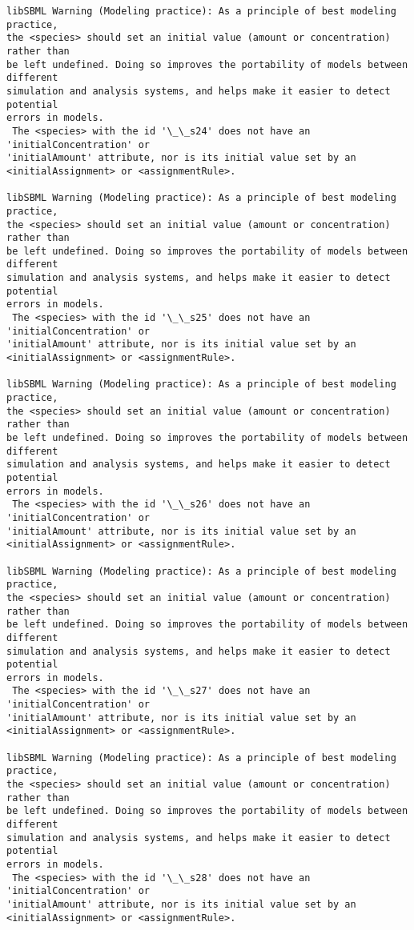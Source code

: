 \documentclass[11pt]{article}
\begin{document}
\begin{Verbatim}[commandchars=\\\{\}]
libSBML Warning (Modeling practice): As a principle of best modeling practice,
the <species> should set an initial value (amount or concentration) rather than
be left undefined. Doing so improves the portability of models between different
simulation and analysis systems, and helps make it easier to detect potential
errors in models.
 The <species> with the id '\_\_s24' does not have an 'initialConcentration' or
'initialAmount' attribute, nor is its initial value set by an
<initialAssignment> or <assignmentRule>.

libSBML Warning (Modeling practice): As a principle of best modeling practice,
the <species> should set an initial value (amount or concentration) rather than
be left undefined. Doing so improves the portability of models between different
simulation and analysis systems, and helps make it easier to detect potential
errors in models.
 The <species> with the id '\_\_s25' does not have an 'initialConcentration' or
'initialAmount' attribute, nor is its initial value set by an
<initialAssignment> or <assignmentRule>.

libSBML Warning (Modeling practice): As a principle of best modeling practice,
the <species> should set an initial value (amount or concentration) rather than
be left undefined. Doing so improves the portability of models between different
simulation and analysis systems, and helps make it easier to detect potential
errors in models.
 The <species> with the id '\_\_s26' does not have an 'initialConcentration' or
'initialAmount' attribute, nor is its initial value set by an
<initialAssignment> or <assignmentRule>.

libSBML Warning (Modeling practice): As a principle of best modeling practice,
the <species> should set an initial value (amount or concentration) rather than
be left undefined. Doing so improves the portability of models between different
simulation and analysis systems, and helps make it easier to detect potential
errors in models.
 The <species> with the id '\_\_s27' does not have an 'initialConcentration' or
'initialAmount' attribute, nor is its initial value set by an
<initialAssignment> or <assignmentRule>.

libSBML Warning (Modeling practice): As a principle of best modeling practice,
the <species> should set an initial value (amount or concentration) rather than
be left undefined. Doing so improves the portability of models between different
simulation and analysis systems, and helps make it easier to detect potential
errors in models.
 The <species> with the id '\_\_s28' does not have an 'initialConcentration' or
'initialAmount' attribute, nor is its initial value set by an
<initialAssignment> or <assignmentRule>.


\end{Verbatim}
\end{document}
